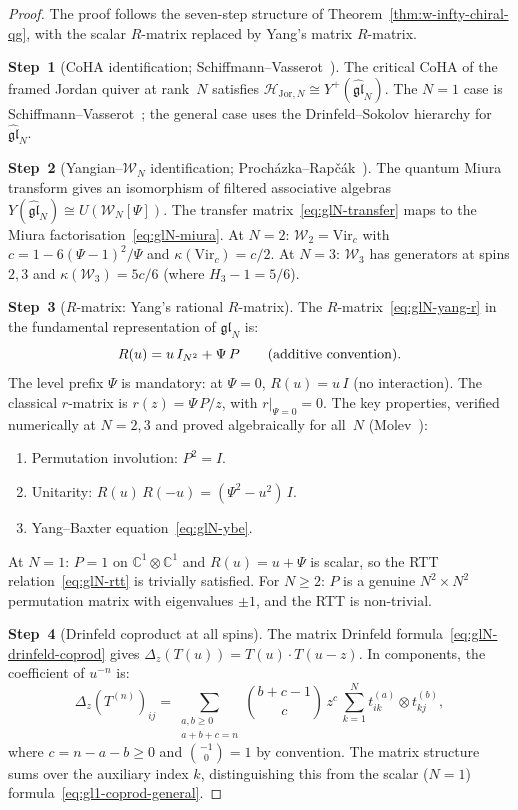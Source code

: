 \documentclass[11pt,reqno]{amsart}
\theoremstyle{definition}
\theoremstyle{remark}
\newcommand{\cH}{\mathcal{H}}
\newcommand{\cW}{\mathcal{W}}
\newcommand{\CC}{\mathbb{C}}
\numberwithin{equation}{section}
\begin{document}
\begin{proof}
The proof follows the seven-step structure of
Theorem~\ref{thm:w-infty-chiral-qg}, with the scalar
$R$-matrix replaced by Yang's matrix $R$-matrix.

\medskip
\noindent
\textbf{Step~1}
(CoHA identification; Schiffmann--Vasserot~\cite{SV13}).
The critical CoHA of the framed Jordan quiver at
rank~$N$ satisfies
$\cH_{\mathrm{Jor},N} \cong Y^+(\widehat{\mathfrak{gl}}_N)$.
The $N = 1$ case is
Schiffmann--Vasserot~\cite{SV13}; the general case
uses the Drinfeld--Sokolov hierarchy for
$\widehat{\mathfrak{gl}}_N$.

\medskip
\noindent
\textbf{Step~2}
(Yangian--$\cW_N$ identification;
Proch\'azka--Rap\v{c}\'ak~\cite{PR19}).
The quantum Miura transform gives an isomorphism of
filtered associative algebras
$Y(\widehat{\mathfrak{gl}}_N) \cong U(\cW_N[\Psi])$.
The transfer matrix~\eqref{eq:glN-transfer}
maps to the Miura
factorisation~\eqref{eq:glN-miura}.
At $N = 2$: $\cW_2 = \mathrm{Vir}_c$ with
$c = 1 - 6(\Psi - 1)^2/\Psi$ and
$\kappa(\mathrm{Vir}_c) = c/2$.
At $N = 3$: $\cW_3$ has generators at spins $2, 3$ and
$\kappa(\cW_3) = 5c/6$ (where $H_3 - 1 = 5/6$).

\medskip
\noindent
\textbf{Step~3}
($R$-matrix: Yang's rational $R$-matrix).
The $R$-matrix~\eqref{eq:glN-yang-r} in the fundamental
representation of $\mathfrak{gl}_N$ is:
\[
  R(u) = u\, I_{N^2} + \Psi\, P
  \qquad \textup{(additive convention)}.
\]
The level prefix $\Psi$ is mandatory: at $\Psi = 0$,
$R(u) = u\, I$ (no interaction). The classical
$r$-matrix is $r(z) = \Psi\, P/z$, with
$r|_{\Psi = 0} = 0$.
The key properties, verified numerically at $N = 2, 3$ and
proved algebraically for all~$N$
(Molev~\cite{Molev07}):
\begin{enumerate}[label=\textup{(\roman*)}]
\item Permutation involution: $P^2 = I$.
\item Unitarity: $R(u)\, R(-u) = (\Psi^2 - u^2)\, I$.
\item Yang--Baxter equation~\eqref{eq:glN-ybe}.
\end{enumerate}
At $N = 1$: $P = 1$ on $\CC^1 \otimes \CC^1$ and
$R(u) = u + \Psi$ is scalar, so the RTT
relation~\eqref{eq:glN-rtt} is trivially satisfied.
For $N \geq 2$: $P$ is a genuine $N^2 \times N^2$
permutation matrix with eigenvalues $\pm 1$, and the
RTT is non-trivial.

\medskip
\noindent
\textbf{Step~4}
(Drinfeld coproduct at all spins).
The matrix Drinfeld
formula~\eqref{eq:glN-drinfeld-coprod} gives
$\Delta_z(T(u)) = T(u) \cdot T(u - z)$. In components,
the coefficient of $u^{-n}$ is:
\[
  \Delta_z(T^{(n)})_{ij}
  = \sum_{\substack{a,b \geq 0 \\ a+b+c = n}}
  \binom{b+c-1}{c}\, z^c\,
  \sum_{k=1}^{N}
  t_{ik}^{(a)} \otimes t_{kj}^{(b)},
\]
where $c = n - a - b \geq 0$ and
$\binom{-1}{0} = 1$ by convention. The matrix structure
sums over the auxiliary index $k$, distinguishing this from
the scalar ($N = 1$) formula~\eqref{eq:gl1-coprod-general}.


\end{proof}
\end{document}

